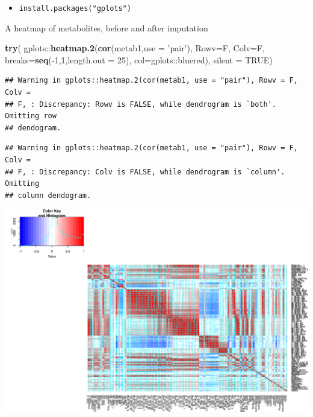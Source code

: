\documentclass[]{article}
\newenvironment{Shaded}{\begin{snugshade}}{\end{snugshade}}
\newcommand{\KeywordTok}[1]{\textcolor[rgb]{0.13,0.29,0.53}{\textbf{{#1}}}}
\newcommand{\DataTypeTok}[1]{\textcolor[rgb]{0.13,0.29,0.53}{{#1}}}
\newcommand{\DecValTok}[1]{\textcolor[rgb]{0.00,0.00,0.81}{{#1}}}
\newcommand{\StringTok}[1]{\textcolor[rgb]{0.31,0.60,0.02}{{#1}}}
\newcommand{\OtherTok}[1]{\textcolor[rgb]{0.56,0.35,0.01}{{#1}}}
\newcommand{\NormalTok}[1]{{#1}}
\providecommand{\tightlist}{%
  \setlength{\itemsep}{0pt}\setlength{\parskip}{0pt}}
\begin{document}
\begin{itemize}
\tightlist
\item
  \texttt{install.packages("gplots")}
\end{itemize}

A heatmap of metabolites, before and after imputation

\begin{Shaded}
\begin{Highlighting}[]
\KeywordTok{try}\NormalTok{(}
  \NormalTok{gplots::}\KeywordTok{heatmap.2}\NormalTok{(}\KeywordTok{cor}\NormalTok{(metab1,}\DataTypeTok{use =} \StringTok{'pair'}\NormalTok{), }\DataTypeTok{Rowv=}\NormalTok{F, }\DataTypeTok{Colv=}\NormalTok{F, }
                    \DataTypeTok{breaks=}\KeywordTok{seq}\NormalTok{(-}\DecValTok{1}\NormalTok{,}\DecValTok{1}\NormalTok{,}\DataTypeTok{length.out =} \DecValTok{25}\NormalTok{), }\DataTypeTok{col=}\NormalTok{gplots::bluered),}
  \DataTypeTok{silent =} \OtherTok{TRUE}\NormalTok{)}
\end{Highlighting}
\end{Shaded}

\begin{verbatim}
## Warning in gplots::heatmap.2(cor(metab1, use = "pair"), Rowv = F, Colv =
## F, : Discrepancy: Rowv is FALSE, while dendrogram is `both'. Omitting row
## dendogram.
\end{verbatim}

\begin{verbatim}
## Warning in gplots::heatmap.2(cor(metab1, use = "pair"), Rowv = F, Colv =
## F, : Discrepancy: Colv is FALSE, while dendrogram is `column'. Omitting
## column dendogram.
\end{verbatim}

\includegraphics{Figs/Heatmap of correlations-1.pdf}
\end{document}
